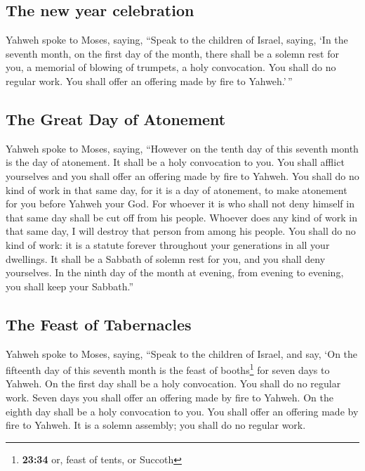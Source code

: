 \hypertarget{the-new-year-celebration}{%
\subsection{The new year celebration}\label{the-new-year-celebration}}

 Yahweh spoke to Moses, saying,  ``Speak
to the children of Israel, saying, `In the seventh month, on the first
day of the month, there shall be a solemn rest for you, a memorial of
blowing of trumpets, a holy convocation.  You shall do no
regular work. You shall offer an offering made by fire to Yahweh.'\,''

\hypertarget{the-great-day-of-atonement}{%
\subsection{The Great Day of
Atonement}\label{the-great-day-of-atonement}}

 Yahweh spoke to Moses, saying,  ``However
on the tenth day of this seventh month is the day of atonement. It shall
be a holy convocation to you. You shall afflict yourselves and you shall
offer an offering made by fire to Yahweh.  You shall do
no kind of work in that same day, for it is a day of atonement, to make
atonement for you before Yahweh your God.  For whoever it
is who shall not deny himself in that same day shall be cut off from his
people.  Whoever does any kind of work in that same day,
I will destroy that person from among his people.  You
shall do no kind of work: it is a statute forever throughout your
generations in all your dwellings.  It shall be a Sabbath
of solemn rest for you, and you shall deny yourselves. In the ninth day
of the month at evening, from evening to evening, you shall keep your
Sabbath.''

\hypertarget{the-feast-of-tabernacles}{%
\subsection{The Feast of Tabernacles}\label{the-feast-of-tabernacles}}

 Yahweh spoke to Moses, saying,  ``Speak
to the children of Israel, and say, `On the fifteenth day of this
seventh month is the feast of booths\footnote{\textbf{23:34} or, feast
  of tents, or Succoth} for seven days to Yahweh.  On the
first day shall be a holy convocation. You shall do no regular work.
 Seven days you shall offer an offering made by fire to
Yahweh. On the eighth day shall be a holy convocation to you. You shall
offer an offering made by fire to Yahweh. It is a solemn assembly; you
shall do no regular work.

